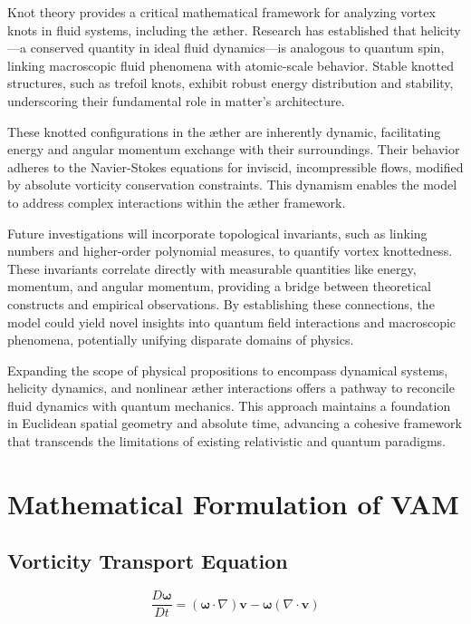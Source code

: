 \documentclass[a4paper,10pt]{article}
\begin{document}
Knot theory provides a critical mathematical framework for analyzing vortex knots in fluid systems, including the æther. Research has established that helicity—a conserved quantity in ideal fluid dynamics—is analogous to quantum spin, linking macroscopic fluid phenomena with atomic-scale behavior. Stable knotted structures, such as trefoil knots, exhibit robust energy distribution and stability, underscoring their fundamental role in matter’s architecture.

These knotted configurations in the æther are inherently dynamic, facilitating energy and angular momentum exchange with their surroundings. Their behavior adheres to the Navier-Stokes equations for inviscid, incompressible flows, modified by absolute vorticity conservation constraints. This dynamism enables the model to address complex interactions within the æther framework.

Future investigations will incorporate topological invariants, such as linking numbers and higher-order polynomial measures, to quantify vortex knottedness. These invariants correlate directly with measurable quantities like energy, momentum, and angular momentum, providing a bridge between theoretical constructs and empirical observations. By establishing these connections, the model could yield novel insights into quantum field interactions and macroscopic phenomena, potentially unifying disparate domains of physics.

Expanding the scope of physical propositions to encompass dynamical systems, helicity dynamics, and nonlinear æther interactions offers a pathway to reconcile fluid dynamics with quantum mechanics. This approach maintains a foundation in Euclidean spatial geometry and absolute time, advancing a cohesive framework that transcends the limitations of existing relativistic and quantum paradigms.




    \section{Mathematical Formulation of VAM}\label{sec:mathematical-formulation-of-vam}

    \subsection{Vorticity Transport Equation}\label{subsec:vorticity-transport-equation}
    \begin{equation} \label{eq:vorticity}
        \frac{D\boldsymbol{\omega}}{Dt} = (\boldsymbol{\omega} \cdot \nabla) \mathbf{v} - \boldsymbol{\omega} (\nabla \cdot \mathbf{v})
    \end{equation}
\end{document}
